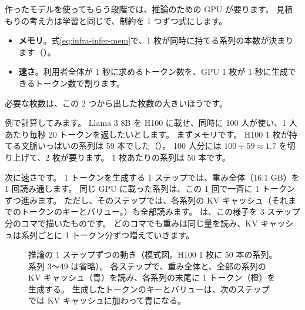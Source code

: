 作ったモデルを使ってもらう段階では、推論のための GPU が要ります。
見積もりの考え方は学習と同じで、制約を 1 つずつ式にします。
\begin{itemize}
\item \textbf{メモリ}。式\eqref{eq:infra-infer-mem}で、1 枚が同時に持てる系列の本数が決まります（）。
\item \textbf{速さ}。利用者全体が 1 秒に求めるトークン数を、GPU 1 枚が 1 秒に生成できるトークン数で割ります。
\end{itemize}
必要な枚数は、この 2 つから出した枚数の大きいほうです。

例で計算してみます。
Llama 3 8B を H100 に載せ、同時に 100 人が使い、1 人あたり毎秒 20 トークンを返したいとします。
まずメモリです。
H100 1 枚が持てる文脈いっぱいの系列は 59 本でした（）。
100 人分には $100\div59\approx1.7$ を切り上げて、2 枚が要ります。
1 枚あたりの系列は 50 本です。

次に速さです。
1 トークンを生成する 1 ステップでは、重み全体（16.1 GB）を 1 回読み通します。
同じ GPU に載った系列は、この 1 回で一斉に 1 トークンずつ進みます。
ただし、そのステップでは、各系列の KV キャッシュ（それまでのトークンのキーとバリュー。）も全部読みます。
は、この様子を 3 ステップ分のコマで描いたものです。
どのコマでも重みは同じ量を読み、KV キャッシュは系列ごとに 1 トークン分ずつ増えていきます。

\begin{figure}[tbp]
\centering
{}
\caption{推論の 1 ステップずつの動き（模式図。H100 1 枚に 50 本の系列。系列 3〜49 は省略）。
各ステップで、重み全体と、全部の系列の KV キャッシュ（青）を読み、各系列の末尾に 1 トークン（橙）を生成する。
生成したトークンのキーとバリューは、次のステップでは KV キャッシュに加わって青になる。}
\label{fig:infra-infer-frames}
\end{figure}

